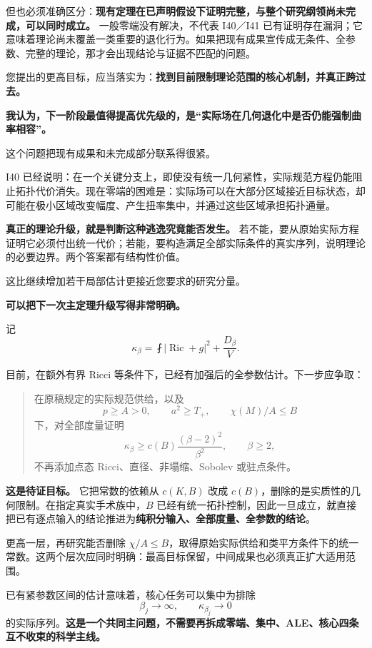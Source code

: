 \documentclass[
  10pt,
]{article}
\begin{document}
但也必须准确区分：\textbf{现有定理在已声明假设下证明完整，与整个研究纲领尚未完成，可以同时成立。}
一般零端没有解决，不代表 I40／I41
已有证明存在漏洞；它意味着理论尚未覆盖一类重要的退化行为。如果把现有成果宣传成无条件、全参数、完整的理论，那才会出现结论与证据不匹配的问题。

您提出的更高目标，应当落实为：\textbf{找到目前限制理论范围的核心机制，并真正跨过去。}

\textbf{我认为，下一阶段最值得提高优先级的，是``实际场在几何退化中是否仍能强制曲率相容''。}

这个问题把现有成果和未完成部分联系得很紧。

I40
已经说明：在一个关键分支上，即使没有统一几何紧性，实际规范方程仍能阻止拓扑代价消失。现在零端的困难是：实际场可以在大部分区域接近目标状态，却可能在极小区域改变幅度、产生扭率集中，并通过这些区域承担拓扑通量。

\textbf{真正的理论升级，就是判断这种逃逸究竟能否发生。}
若不能，要从原始实际方程证明它必须付出统一代价；若能，要构造满足全部实际条件的真实序列，说明理论的必要边界。两个答案都有结构性价值。

这比继续增加若干局部估计更接近您要求的研究分量。

\textbf{可以把下一次主定理升级写得非常明确。}

记 \[
\kappa_\beta
=\fint|\operatorname{Ric}+g|^2+\frac{D_\beta}{V}.
\]

目前，在额外有界 Ricci
等条件下，已经有加强后的全参数估计。下一步应争取：

\begin{quote}
在原稿规定的实际规范供给，以及 \[
p\ge A>0,\qquad a^2\ge T_+,\qquad \chi(M)/A\le B
\] 下，对全部度量证明 \[
\boxed{\kappa_\beta\ge c(B)\frac{(\beta-2)^2}{\beta^2},\qquad\beta\ge2,}
\] 不再添加点态 Ricci、直径、非塌缩、Sobolev 或驻点条件。
\end{quote}

\textbf{这是待证目标。} 它把常数的依赖从 \(c(K,B)\) 改成
\(c(B)\)，删除的是实质性的几何限制。在指定真实手术族中，\(B\)
已经有统一拓扑控制，因此一旦成立，就直接把已有逐点输入的结论推进为\textbf{纯积分输入、全部度量、全参数的结论}。

更高一层，再研究能否删除
\(\chi/A\le B\)，取得原始实际供给和类平方条件下的统一常数。这两个层次应同时明确：最高目标保留，中间成果也必须真正扩大适用范围。

已有紧参数区间的估计意味着，核心任务可以集中为排除 \[
\beta_j\to\infty,\qquad \kappa_{\beta_j}\to0
\]
的实际序列。\textbf{这是一个共同主问题，不需要再拆成零端、集中、ALE、核心四条互不收束的科学主线。}
\end{document}
